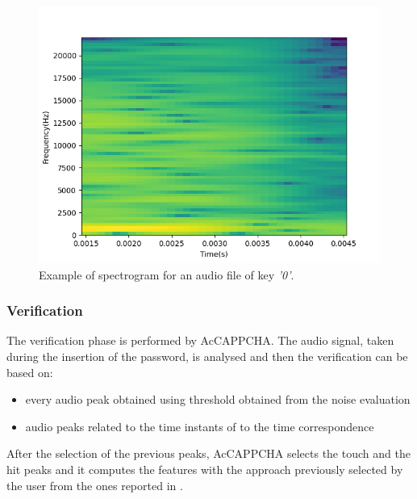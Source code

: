 \begin{figure}[H]
     \centering
     \includegraphics[width=.8\linewidth]{Images/AcCAPPCHA/spectrogram}
     \caption{\footnotesize{Example of spectrogram for an audio file of key \textit{'0'}.}}\label{AcCAPPCHA:spectrogram}
\end{figure}

\subsubsection{Verification}
The verification phase is performed by AcCAPPCHA. The audio signal, taken during the insertion of the password, is analysed and then the verification can be based on:
\begin{itemize}
\item{every audio peak obtained using threshold obtained from the noise evaluation}
\item{audio peaks related to the time instants of to the time correspondence}
\end{itemize}
After the selection of the previous peaks, AcCAPPCHA selects the touch and the hit peaks and it computes the features with the approach previously selected by the user from the ones reported in . 


